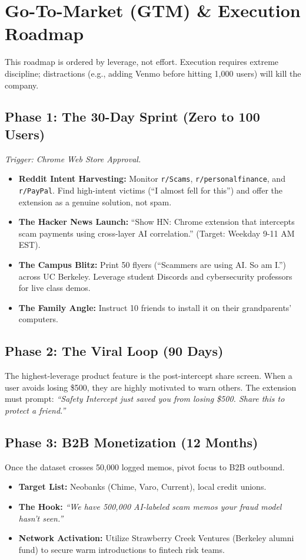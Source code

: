 \documentclass[12pt, letterpaper]{article}
\begin{document}
\newpage
\section{Go-To-Market (GTM) \& Execution Roadmap}

This roadmap is ordered by leverage, not effort. Execution requires extreme discipline; distractions (e.g., adding Venmo before hitting 1,000 users) will kill the company.

\subsection{Phase 1: The 30-Day Sprint (Zero to 100 Users)}
\textit{Trigger: Chrome Web Store Approval.}
\begin{itemize}
    \item \textbf{Reddit Intent Harvesting:} Monitor \texttt{r/Scams}, \texttt{r/personalfinance}, and \texttt{r/PayPal}. Find high-intent victims (``I almost fell for this'') and offer the extension as a genuine solution, not spam.
    \item \textbf{The Hacker News Launch:} ``Show HN: Chrome extension that intercepts scam payments using cross-layer AI correlation.'' (Target: Weekday 9-11 AM EST).
    \item \textbf{The Campus Blitz:} Print 50 flyers (``Scammers are using AI. So am I.'') across UC Berkeley. Leverage student Discords and cybersecurity professors for live class demos.
    \item \textbf{The Family Angle:} Instruct 10 friends to install it on their grandparents' computers. 
\end{itemize}

\subsection{Phase 2: The Viral Loop (90 Days)}
The highest-leverage product feature is the post-intercept share screen. When a user avoids losing \$500, they are highly motivated to warn others. The extension must prompt: \textit{``Safety Intercept just saved you from losing \$500. Share this to protect a friend.''}\

\subsection{Phase 3: B2B Monetization (12 Months)}
Once the dataset crosses 50,000 logged memos, pivot focus to B2B outbound.
\begin{itemize}
    \item \textbf{Target List:} Neobanks (Chime, Varo, Current), local credit unions.
    \item \textbf{The Hook:} \textit{``We have 500,000 AI-labeled scam memos your fraud model hasn't seen.''}
    \item \textbf{Network Activation:} Utilize Strawberry Creek Ventures (Berkeley alumni fund) to secure warm introductions to fintech risk teams.
\end{itemize}
\end{document}
